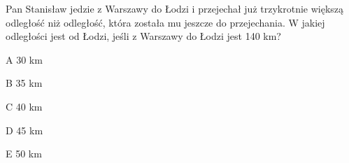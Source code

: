 \begin{tresc}
Pan Stanisław jedzie z Warszawy do Łodzi i przejechał już trzykrotnie większą odległość niż odległość, która została mu jeszcze do przejechania. W jakiej odległości jest od Łodzi, jeśli z Warszawy do Łodzi jest 140 km?
\end{tresc}
\begin{wariant}{A} 30 km \end{wariant}
\begin{wariant}{B} 35 km \end{wariant}
\begin{wariant}{C} 40 km \end{wariant}
\begin{wariant}{D} 45 km \end{wariant}
\begin{wariant}{E} 50 km \end{wariant}
